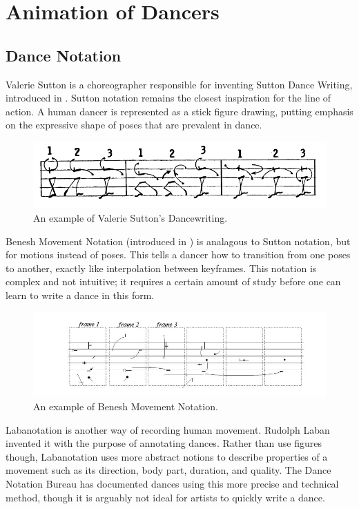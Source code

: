 \section{Animation of Dancers}
\subsection{Dance Notation}
Valerie Sutton is a choreographer responsible for inventing Sutton Dance Writing, introduced in \citep{sutton1979sutton}. Sutton notation remains the closest inspiration for the line of action. A human dancer is represented as a stick figure drawing, putting emphasis on the expressive shape of poses that are prevalent in dance.

\begin{figure}[!h]
\centering
\includegraphics[scale=0.5]{img/sutton}
\caption{An example of Valerie Sutton's Dancewriting.}
\end{figure}

Benesh Movement Notation (introduced in \citep{causley1980introduction}) is analagous to Sutton notation, but for motions instead of poses. This tells a dancer how to transition from one poses to another, exactly like interpolation between keyframes. This notation is complex and not intuitive; it requires a certain amount of study before one can learn to write a dance in this form.

\begin{figure}[!h]
\centering
\includegraphics[scale=0.5]{img/benesh}
\caption{An example of Benesh Movement Notation.}
\end{figure}

Labanotation is another way of recording human movement. Rudolph Laban invented it with the purpose of annotating dances. Rather than use figures though, Labanotation uses more abstract notions to describe properties of a movement such as its direction, body part, duration, and quality. The Dance Notation Bureau has documented dances using this more precise and technical method, though it is arguably not ideal for artists to quickly write a dance.

